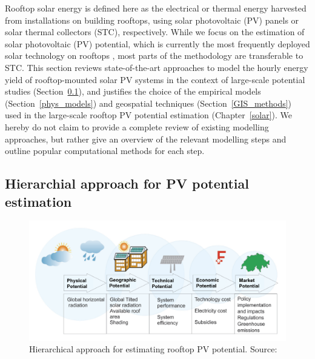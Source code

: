 Rooftop solar energy is defined here as the electrical or thermal energy harvested from installations on building rooftops, using solar photovoltaic (PV) panels or solar thermal collectors (STC), respectively. 
While we focus on the estimation of solar photovoltaic (PV) potential, which is currently the most frequently deployed solar technology on rooftops \cite{kaufmann_schweizerische_2017}, most parts of the methodology
are transferable to STC. 
This section reviews state-of-the-art approaches to model the hourly energy yield of rooftop-mounted solar PV systems in the context of large-scale potential studies (Section~\ref{method_solar_hierarchy}), and justifies the choice of the empirical models (Section~\ref{phys_models}) and geospatial techniques (Section~\ref{GIS_methods})
used in the large-scale rooftop PV potential estimation (Chapter~\ref{solar}). 
We hereby do not claim to provide a complete review of existing modelling approaches, but rather give an overview of the relevant modelling steps and outline popular computational methods for each step.

\subsection{Hierarchial approach for PV potential estimation}
\label{method_solar_hierarchy}

\begin{figure}[b]
	\centering
	\includegraphics[width=\linewidth]{images/Figs/hierarchy.png}  
	\caption{Hierarchical approach for estimating rooftop PV potential. Source: \citet{assouline_estimation_2017}}
	\label{fig:solar_hierarchy}
\end{figure}

